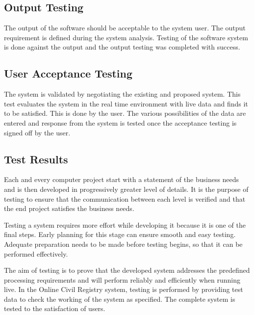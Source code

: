 \documentclass[a4paper,12pt]{article}
\begin{document}
\subsection{Output Testing}\vspace{2mm}
The output of the software should be acceptable to the system user. The output requirement is defined during the system analysis. Testing of the software system is done against the output and the output testing was completed with success.
\subsection{User Acceptance Testing}\vspace{2mm}
The system is validated by negotiating the existing and proposed system. This test evaluates the system in the real time environment with live data and finds it to be satisfied. This is done by the user. The various possibilities of the data are entered and response from the system is tested once the acceptance testing is signed off by the user. 
\newpage
\subsection{Test Results}\vspace{2mm}
Each and every computer project start with a statement of   the business needs and is then developed in progressively greater level of details. It is the purpose of testing to ensure that the communication between each level is verified and that the end project satisfies the business needs.
\par\vspace{2mm}
Testing a system requires more effort while developing it because it is one of the final steps. Early planning for this stage can ensure smooth and easy testing. Adequate preparation needs to be made before testing begins, so that it can be performed effectively.
\par\vspace{2mm}
The aim of testing is to prove that the developed system addresses the predefined processing requirements and will perform reliably and efficiently when running live. In the Online Civil Registry system, testing is performed by providing test data to check the working of the system as specified. The complete system is tested to the satisfaction of users.
\end{document}
